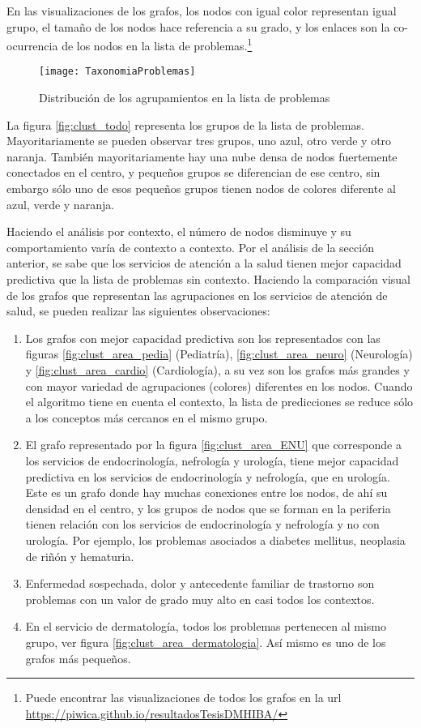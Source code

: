 En las visualizaciones de los grafos, los nodos con igual color representan igual grupo, el tamaño de los nodos hace referencia a su grado, y los enlaces son la co-ocurrencia de los nodos en la lista de problemas.\footnote{Puede encontrar las visualizaciones de todos los grafos en la url \url{https://piwica.github.io/resultadosTesisDMHIBA/}}

\begin{figure}[ht]
\caption{Distribución de los agrupamientos en la lista de problemas}
\label{fig:taxonomiaProblemas}
\centering
\texttt{[image: TaxonomiaProblemas]}
\end{figure}

La figura \ref{fig:clust_todo} representa los grupos de la lista de problemas. Mayoritariamente se pueden observar tres grupos, uno azul, otro verde y otro naranja. También mayoritariamente hay una nube densa de nodos fuertemente conectados en el centro, y pequeños grupos se diferencian de ese centro, sin embargo sólo uno de esos pequeños grupos tienen nodos de colores diferente al azul, verde y naranja.

Haciendo el análisis por contexto, el número de nodos disminuye y su comportamiento varía de contexto a contexto. Por el análisis de la sección anterior, se sabe que los servicios de atención a la salud tienen mejor capacidad predictiva que la lista de problemas sin contexto. Haciendo la comparación visual de los grafos que representan las agrupaciones en los servicios de atención de salud, se pueden realizar las siguientes observaciones:

\begin{enumerate}
\item Los grafos con mejor capacidad predictiva son los representados con las figuras \ref{fig:clust_area_pedia} (Pediatría), \ref{fig:clust_area_neuro} (Neurología) y \ref{fig:clust_area_cardio} (Cardiología), a su vez son los grafos más grandes y con mayor variedad de agrupaciones (colores) diferentes en los nodos. Cuando el algoritmo tiene en cuenta el contexto, la lista de predicciones se reduce sólo a los conceptos más cercanos en el mismo grupo.
\item El grafo representado por la figura \ref{fig:clust_area_ENU} que corresponde a los servicios de endocrinología, nefrología y urología, tiene mejor capacidad predictiva en los servicios de endocrinología y nefrología, que en urología. Este es un grafo donde hay muchas conexiones entre los nodos, de ahí su densidad en el centro, y los grupos de nodos que se forman en la periferia tienen relación con los servicios de endocrinología y nefrología y no con urología. Por ejemplo, los problemas asociados a diabetes mellitus, neoplasia de riñón y hematuria.
\item Enfermedad sospechada, dolor y antecedente familiar de trastorno son problemas con un valor de grado muy alto en casi todos los contextos.
\item En el servicio de dermatología, todos los problemas pertenecen al mismo grupo, ver figura \ref{fig:clust_area_dermatologia}. Así mismo es uno de los grafos más pequeños.
\end{enumerate}

